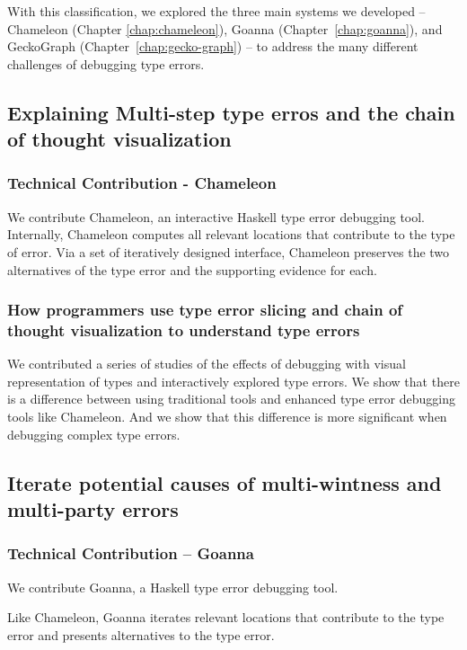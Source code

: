 With this classification, we explored the three main systems we developed --  Chameleon (Chapter \ref{chap:chameleon}), Goanna (Chapter~\ref{chap:goanna}), and GeckoGraph (Chapter~\ref{chap:gecko-graph}) -- to address the many different challenges of debugging type errors.

\subsection{Explaining Multi-step type erros and the chain of thought visualization}

\subsubsection{Technical Contribution - Chameleon}
We contribute Chameleon, an interactive Haskell type error debugging tool. Internally, Chameleon computes all relevant locations that contribute to the type of error. Via a set of iteratively designed interface, Chameleon preserves the two alternatives of the type error and the supporting evidence for each.

\subsubsection{How programmers use type error slicing and chain of thought visualization to understand type errors}
We  contributed a series of studies of the effects of debugging with visual representation of types and interactively explored type errors. We show that there is a difference between using traditional tools and enhanced type error debugging tools like Chameleon. And we show that this difference is more significant when debugging complex type errors.

\subsection{Iterate potential causes of multi-wintness and multi-party errors}

\subsubsection{Technical Contribution -- Goanna}

We contribute Goanna, a Haskell type error debugging tool. 

Like Chameleon, Goanna iterates relevant locations that contribute to the type error and presents alternatives to the type error. 

